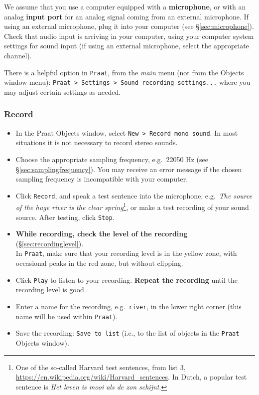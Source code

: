 \documentclass[
]{book}
\begin{document}
We assume that you use a computer equipped with a \textbf{microphone}, or with an analog \textbf{input port} for an analog signal coming from an external microphone. If using an external microphone, plug it into your computer (see §\ref{sec:microphone}). Check that audio input is arriving in your computer, using your computer system settings for sound input (if using an external microphone, select the appropriate channel).

There is a helpful option in \texttt{Praat}, from the \emph{main} menu (not from the Objects window menu): \texttt{Praat\ \textgreater{}\ Settings\ \textgreater{}\ Sound\ recording\ settings...} where you may adjust certain settings as needed.

\label{box-praatrecord}
\subsubsection{Record}\label{sec:praatrecord}

\begin{itemize}
\item
  In the Praat Objects window, select \texttt{New\ \textgreater{}\ Record\ mono\ sound}.
  In most situations it is not necessary to record stereo sounds.
\item
  Choose the appropriate sampling frequency, e.g.~22050 Hz (see §\ref{sec:samplingfrequency}). You may receive an error message if the chosen sampling frequency is incompatible with your computer.
\item
  Click \texttt{Record}, and speak a test sentence into the microphone, e.g.~\emph{The source of the huge river is the clear spring}\footnote{One of the so-called Harvard test sentences, from list 3, \url{https://en.wikipedia.org/wiki/Harvard_sentences}. In Dutch, a popular test sentence is \emph{Het leven is mooi als de zon schijnt}.}, or make a test recording of your sound source. After testing, click \texttt{Stop}.
\item
  \textbf{While recording, check the level of the recording} (§\ref{sec:recordinglevel}).\\
  In \texttt{Praat}, make sure that your recording level is in the yellow zone, with occasional peaks in the red zone, but without clipping.
\item
  Click \texttt{Play} to listen to your recording. \textbf{Repeat the recording} until the recording level is good.
\item
  Enter a name for the recording, e.g.~\texttt{river}, in the lower right corner (this name will be used within \texttt{Praat}).
\item
  Save the recording: \texttt{Save\ to\ list} (i.e., to the list of objects in the \texttt{Praat} Objects window).
\end{itemize}
\end{document}
